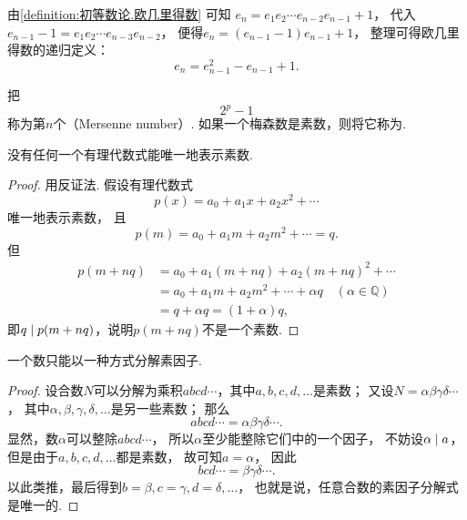 由\cref{definition:初等数论.欧几里得数} 可知
\(e_n = e_1 e_2 \dotsm e_{n-2} e_{n-1} + 1\)，
代入\(e_{n-1} - 1 = e_1 e_2 \dotsm e_{n-3} e_{n-2}\)，
便得\(e_n = (e_{n-1} - 1) e_{n-1} + 1\)，
整理可得欧几里得数的递归定义：\begin{equation}
	e_n = e_{n-1}^2 - e_{n-1} + 1.
\end{equation}

\begin{definition}
把\[
	2^p - 1
\]称为第\(n\)个（Mersenne number）.
如果一个梅森数是素数，则将它称为.
\end{definition}

\begin{theorem}
没有任何一个有理代数式能唯一地表示素数.
\begin{proof}
用反证法.
假设有理代数式\[
	p(x) = a_0 + a_1 x + a_2 x^2 + \dotsb
\]唯一地表示素数，
且\[
	p(m) = a_0 + a_1 m + a_2 m^2 + \dotsb = q.
\]
但\begin{align*}
	p(m+nq) &= a_0 + a_1 (m+nq) + a_2 (m+nq)^2 + \dotsb \\
	&= a_0 + a_1 m + a_2 m^2 + \dotsb + \alpha q \quad(\alpha\in\mathbb{Q}) \\
	&= q + \alpha q = (1+\alpha)q,
\end{align*}
即\(\truediv{p(m+nq)}{q}\)，说明\(p(m+nq)\)不是一个素数.
\end{proof}
\end{theorem}

\begin{theorem}[算数基本定理]
一个数只能以一种方式分解素因子.
\begin{proof}
设合数\(N\)可以分解为乘积\(abcd\dotsm\)，其中\(a,b,c,d,\dotsc\)是素数；
又设\(N = \alpha\beta\gamma\delta\dotsm\)，
其中\(\alpha,\beta,\gamma,\delta,\dotsc\)是另一些素数；
那么\[
	abcd\dotsm = \alpha\beta\gamma\delta\dotsm.
\]
显然，数\(\alpha\)可以整除\(abcd\dotsm\)，
所以\(\alpha\)至少能整除它们中的一个因子，
不妨设\(\truediv{a}{\alpha}\)，
但是由于\(a,b,c,d,\dotsc\)都是素数，
故可知\(a=\alpha\)，
因此\[
	bcd\dotsm = \beta\gamma\delta\dotsm.
\]
以此类推，最后得到\(b=\beta,c=\gamma,d=\delta,\dotsc\)，
也就是说，任意合数的素因子分解式是唯一的.
\end{proof}
\end{theorem}

